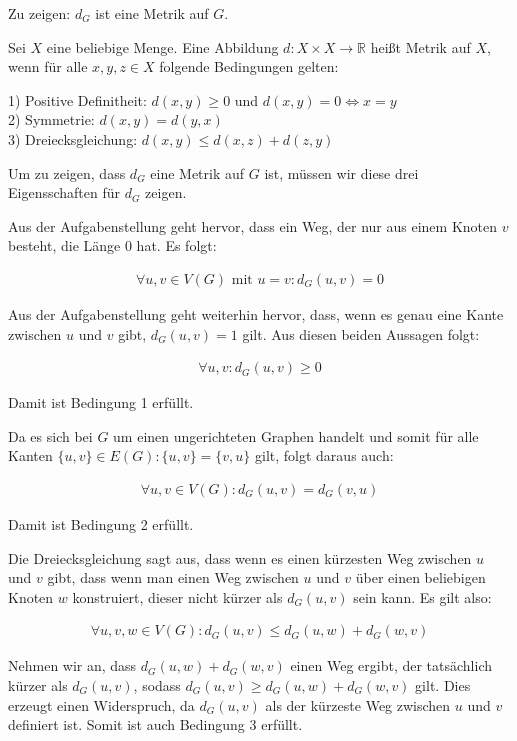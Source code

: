 \documentclass[12pt]{scrartcl}%
\theoremstyle{nonumberplain}
\newcommand{\R}{\mathbb{R}}
\begin{document}
Zu zeigen: $d_G$ ist eine Metrik auf $G$.

Sei $X$ eine beliebige Menge. Eine Abbildung $d: X \times X \rightarrow \R$ heißt Metrik auf $X$, wenn für alle $x,y,z \in X$ folgende Bedingungen gelten:

1) Positive Definitheit: $d(x,y) \ge 0$ und $d(x,y) = 0 \Leftrightarrow x = y $ \\
2) Symmetrie: $d(x,y) = d(y,x)$ \\
3) Dreiecksgleichung: $d(x,y) \le d(x,z) + d(z,y)$

Um zu zeigen, dass $d_G$ eine Metrik auf $G$ ist, müssen wir diese drei Eigensschaften für $d_G$ zeigen.

Aus der Aufgabenstellung geht hervor, dass ein Weg, der nur aus einem Knoten $v$ besteht, die Länge $0$ hat. Es folgt:

\begin{align*}
	\forall u,v \in V(G)\text{ mit } u=v: d_G(u,v) = 0
\end{align*}

Aus der Aufgabenstellung geht weiterhin hervor, dass, wenn es genau eine Kante zwischen $u$ und $v$ gibt, $d_G(u,v) = 1$ gilt.  Aus diesen beiden Aussagen folgt:

\begin{align*}
	\forall u,v: d_G(u,v) \ge 0
\end{align*}

Damit ist Bedingung 1 erfüllt.

Da es sich bei $G$ um einen ungerichteten Graphen handelt und somit für alle Kanten $\{u,v\} \in E(G): \{u,v\} = \{v,u\}$ gilt, folgt daraus auch:

\begin{align*}
	\forall u,v \in V(G): d_G(u,v) = d_G(v,u)
\end{align*}

Damit ist Bedingung 2 erfüllt.

Die Dreiecksgleichung sagt aus, dass wenn es einen kürzesten Weg zwischen $u$ und $v$ gibt, dass wenn man einen Weg zwischen $u$ und $v$ über einen beliebigen Knoten $w$ konstruiert, dieser nicht kürzer als $d_G(u,v)$ sein kann. Es gilt also:

\begin{align*}
	\forall u,v,w \in V(G): d_G(u,v) \le d_G(u,w) + d_G(w,v)
\end{align*}

Nehmen wir an, dass $d_G(u,w) + d_G(w,v)$ einen Weg ergibt, der tatsächlich kürzer als $d_G(u,v)$, sodass $d_G(u,v) \ge d_G(u,w) + d_G(w,v)$ gilt. Dies erzeugt einen Widerspruch, da $d_G(u,v)$ als der kürzeste Weg zwischen $u$ und $v$ definiert ist. Somit ist auch Bedingung 3 erfüllt.
\end{document}
